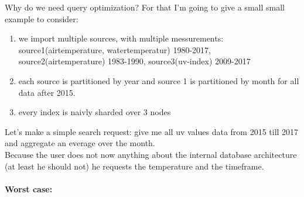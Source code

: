 Why do we need query optimization? For that I'm going to give a small small example to consider:
\begin{enumerate}  
\item we import multiple sources, with multiple messurements: source1(airtemperature, watertemperatur) 1980-2017, source2(airtemperature) 1983-1990, source3(uv-index) 2009-2017
\item each source is partitioned by year and source 1 is partitioned by month for all data after 2015.
\item every index is naivly sharded over 3 nodes
\end{enumerate}
Let's make a simple search request: give me all uv values data from 2015 till 2017 and aggregate an everage over the month.\\
Because the user does not now anything about the internal database architecture (at least he should not) he requests the temperature and the timeframe.\\
\\
\textbf{Worst case:}

